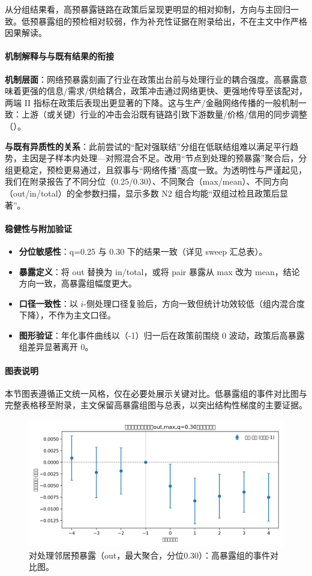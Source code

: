 从分组结果看，高预暴露链路在政策后呈现更明显的相对抑制，方向与主回归一致。低预暴露组的预检相对较弱，作为补充性证据在附录给出，不在主文中作严格因果解读。
\paragraph{机制解释与与既有结果的衔接}
\textbf{机制层面}：网络预暴露刻画了行业在政策出台前与处理行业的耦合强度。高暴露意味着更强的信息/需求/供给耦合，政策冲击通过网络更快、更强地传导至该配对，两端 II 指标在政策后表现出更显著的下降。这与生产/金融网络传播的一般机制一致：上游（或关键）行业的冲击会沿既有链路引致下游数量/价格/信用的同步调整（\citep{acemoglu2012network,carvalho2014micro,diebold2014connectedness}）。

\textbf{与既有异质性的关系}：此前尝试的“配对强联结”分组在低联结组难以满足平行趋势，主因是子样本内处理—对照混合不足。改用“节点到处理的预暴露”聚合后，分组更稳定，预检更易通过，且叙事与“网络传播”高度一致。为透明性与严谨起见，我们在附录报告了不同分位（0.25/0.30）、不同聚合（max/mean）、不同方向（out/in/total）的全参数扫描，显示多数 N2 组合均能“双组过检且政策后显著”。

\paragraph{稳健性与附加验证}
\begin{itemize}
  \item \textbf{分位敏感性}：q=0.25 与 0.30 下的结果一致（详见 sweep 汇总表）。
  \item \textbf{暴露定义}：将 out 替换为 in/total，或将 pair 暴露从 max 改为 mean，结论方向一致，高暴露组幅度更大。
  \item \textbf{口径一致性}：以 \(i\)-侧处理口径复验后，方向一致但统计功效较低（组内混合度下降），不作为主文口径。
  \item \textbf{图形验证}：年化事件曲线以（-1）归一后在政策前围绕 0 波动，政策后高暴露组差异显著离开 0。
\end{itemize}

\paragraph{图表说明}
本节图表遵循正文统一风格，仅在必要处展示关键对比。低暴露组的事件对比图与完整表格移至附录，主文保留高暴露组图与总表，以突出结构性梯度的主要证据。

\begin{figure}[!htbp]
  \centering
  \includegraphics[width=0.85\linewidth]{figures/heterogeneity_event_exposure_out_max_q30_high.png}
  \caption{对处理邻居预暴露（out，最大聚合，分位0.30）：高暴露组的事件对比图。}
  \label{fig:hetero_expo_high}
\end{figure}


